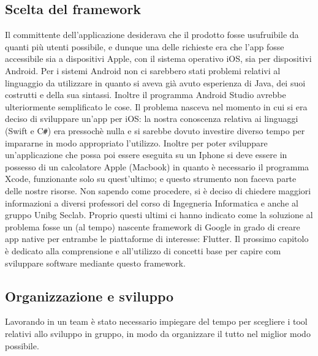 	\subsection{Scelta del framework}
	Il committente dell'applicazione desiderava che il prodotto fosse 
	usufruibile  da quanti più utenti possibile, e dunque una delle richieste
	era che l'app fosse accessibile sia a dispositivi Apple, con il sistema
	operativo iOS, sia per dispositivi Android. \newline
	Per i sistemi Android non ci sarebbero stati problemi relativi al linguaggio
	da utilizzare in quanto si aveva già avuto esperienza di Java, dei suoi
	costrutti e della sua sintassi. Inoltre il programma Android Studio avrebbe
	ulteriormente semplificato le cose. Il problema nasceva nel momento in cui
	si era deciso di sviluppare un'app per iOS: la nostra conoscenza relativa
	ai
	linguaggi (Swift e C\verb|#|) era pressochè nulla e si sarebbe dovuto
	investire diverso tempo per impararne in modo appropriato l'utilizzo. 
	Inoltre per poter sviluppare un'applicazione che possa poi essere eseguita su un
	Iphone si deve essere in possesso di un calcolatore Apple (Macbook) in
	quanto è necessario il programma Xcode, funzionante solo su quest'ultimo; e
	questo strumento non faceva parte delle nostre risorse.
	Non
	sapendo come procedere, si è deciso di chiedere maggiori informazioni a
	diversi	professori del corso di Ingegneria Informatica e anche al gruppo
	Unibg Seclab. Proprio questi ultimi ci hanno indicato come la soluzione al
	problema fosse un (al tempo) nascente framework di Google in grado di creare
	app native per entrambe le piattaforme di interesse: Flutter. Il prossimo
	capitolo è dedicato alla comprensione e all'utilizzo di concetti base per
	capire com sviluppare software mediante questo framework.
	
	\subsection{Organizzazione e sviluppo}
	Lavorando in un team è stato necessario impiegare del tempo per scegliere i 
	tool relativi allo sviluppo in gruppo, in modo da organizzare il tutto nel 
	miglior modo possibile.

